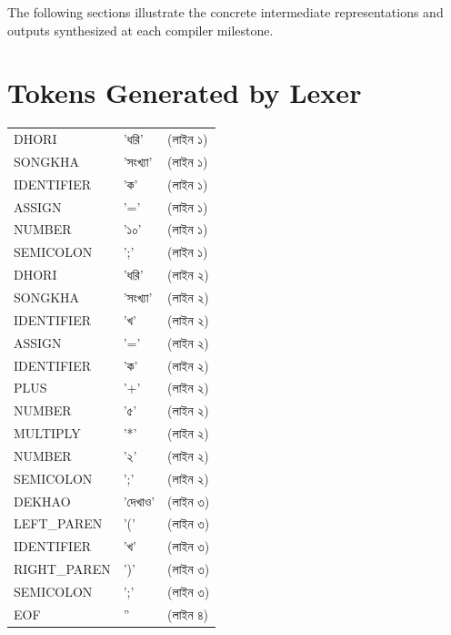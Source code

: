 \documentclass[12pt, a4paper]{report}
\begin{document}
The following sections illustrate the concrete intermediate representations and outputs synthesized at each compiler milestone.

\section{Tokens Generated by Lexer}
\begin{tcolorbox}[colback=codegray,colframe=black!20,arc=0mm,boxrule=0.5pt,left=10pt,right=10pt,top=4pt,bottom=4pt]
\ttfamily\small
\begin{tabular}{@{}l@{\quad:\quad}l@{\qquad}l@{}}
DHORI       & 'ধরি'      & (লাইন ১) \\
SONGKHA     & 'সংখ্যা'    & (লাইন ১) \\
IDENTIFIER  & 'ক'        & (লাইন ১) \\
ASSIGN      & '='        & (লাইন ১) \\
NUMBER      & '১০'       & (লাইন ১) \\
SEMICOLON   & ';'        & (লাইন ১) \\
DHORI       & 'ধরি'      & (লাইন ২) \\
SONGKHA     & 'সংখ্যা'    & (লাইন ২) \\
IDENTIFIER  & 'খ'        & (লাইন ২) \\
ASSIGN      & '='        & (লাইন ২) \\
IDENTIFIER  & 'ক'        & (লাইন ২) \\
PLUS        & '+'        & (লাইন ২) \\
NUMBER      & '৫'        & (লাইন ২) \\
MULTIPLY    & '*'        & (লাইন ২) \\
NUMBER      & '২'        & (লাইন ২) \\
SEMICOLON   & ';'        & (লাইন ২) \\
DEKHAO      & 'দেখাও'    & (লাইন ৩) \\
LEFT\_PAREN & '('        & (লাইন ৩) \\
IDENTIFIER  & 'খ'        & (লাইন ৩) \\
RIGHT\_PAREN& ')'        & (লাইন ৩) \\
SEMICOLON   & ';'        & (লাইন ৩) \\
EOF         & ''         & (লাইন ৪)
\end{tabular}
\end{tcolorbox}
\end{document}
